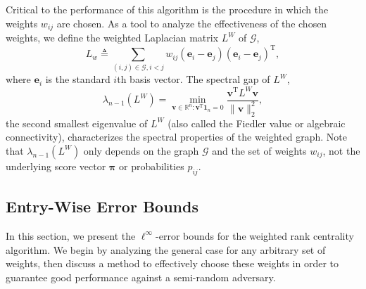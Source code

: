 \documentclass[sigconf,nonacm,pbalance]{acmart}
\newcommand{\tran}{{\mathrm{T}}}
\begin{document}
Critical to the performance of this algorithm is the procedure in which the weights $w_{ij}$ are chosen. As a tool to analyze the effectiveness of the chosen weights, we define the weighted Laplacian matrix $L^W$ of $\mathcal{G}$,
\begin{equation}
    L_w \triangleq \sum_{(i, j) \in \mathcal{G}, i<j} w_{ij} (\bm{e}_i-\bm{e}_j)(\bm{e}_i-\bm{e}_j)^\tran,
\end{equation}
where $\bm{e}_i$ is the standard $i$th basis vector. The spectral gap of $L^W$,
\begin{equation}
    \lambda_{n-1}(L^W) = \min_{\bm{v} \in \mathbb{R}^n: \bm{v}^\tran \bm{1}_n=0} \frac{\bm{v}^\tran L^W \bm{v}}{\|\bm{v}\|_2^2}, 
\end{equation}
the second smallest eigenvalue of $L^W$ (also called the Fiedler value or algebraic connectivity), characterizes the spectral properties of the weighted graph. Note that $\lambda_{n-1}(L^W)$ only depends on the graph $\mathcal{G}$ and the set of weights $w_{ij}$, not the underlying score vector $\bm{\pi}$ or probabilities $p_{ij}$.

\subsection{Entry-Wise Error Bounds}
In this section, we present the $\ell^\infty$-error bounds for the weighted rank centrality algorithm. We begin by analyzing the general case for any arbitrary set of weights, then discuss a method to effectively choose these weights in order to guarantee good performance against a semi-random adversary. 
\end{document}

